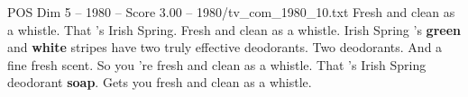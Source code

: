 \begin{textsample}{POS Dim 5 – 1980 – Score 3.00 – 1980/tv\_com\_1980\_10.txt}  \label{ex:f5_pos_005}
Fresh and clean as a whistle.
That 's Irish Spring.
Fresh and clean as a whistle.
Irish Spring 's \textbf{green} and \textbf{white} stripes have two truly effective deodorants.
Two deodorants.
And a fine fresh scent.
So you 're fresh and clean as a whistle.
That 's Irish Spring deodorant \textbf{soap}.
Gets you fresh and clean as a whistle.

\end{textsample}
